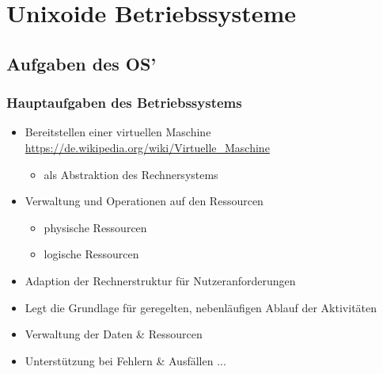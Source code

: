 \documentclass[xcolor=dvipsnames,aspectratio=169]{beamer}
\begin{document}

\section{Unixoide Betriebssysteme}
\subsection{Aufgaben des OS'}

\begin{frame}{}
\end{frame}

\begin{frame}
	\frametitle{Hauptaufgaben des Betriebssystems}
	\begin{itemize}
		\item Bereitstellen einer virtuellen Maschine \url{https://de.wikipedia.org/wiki/Virtuelle_Maschine}
		\begin{itemize}
			\item als Abstraktion des Rechnersystems
		\end{itemize}
		\item Verwaltung und Operationen auf den Ressourcen
		\begin{itemize}
			\item physische Ressourcen
			\item logische Ressourcen
		\end{itemize}
		\item Adaption der Rechnerstruktur für Nutzeranforderungen
		\item Legt die Grundlage für geregelten, nebenläufigen Ablauf der Aktivitäten
		\item Verwaltung der Daten \& Ressourcen
		\item Unterstützung bei Fehlern \& Ausfällen ...
	\end{itemize}
\end{frame}
\end{document}
